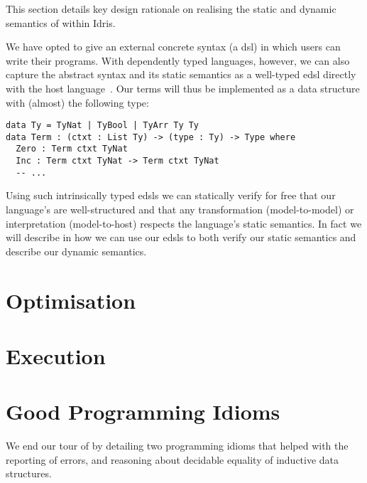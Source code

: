 \documentclass[%
draft, %
a4paper,
UKenglish,
cleveref,
autoref,
thm-restate,
pdfa
]{oasics-v2021}
\begin{document}
This section details key design rationale on realising the static and dynamic semantics of \Velo{} within Idris.

We have opted to give \Velo{} an external concrete syntax (a \ac{dsl}) in which users can write their programs.
%
With dependently typed languages, however, we can also capture the abstract syntax and its static semantics as a well-typed \ac{edsl} directly with the host language~\cite{Augustsson1999edt}.
Our terms will thus be implemented as a data structure with (almost) the following type:

\begin{Verbatim}
data Ty = TyNat | TyBool | TyArr Ty Ty
data Term : (ctxt : List Ty) -> (type : Ty) -> Type where
  Zero : Term ctxt TyNat
  Inc : Term ctxt TyNat -> Term ctxt TyNat
  -- ...
\end{Verbatim}

\noindent

Using such intrinsically typed \acp{edsl} we can statically verify for free that our language's are well-structured and that any transformation (model-to-model) or interpretation (model-to-host) respects the language's static semantics.
In fact we will describe in  how we can use our \acp{edsl} to both verify our static semantics and describe our dynamic semantics.






\section{Optimisation}
\label{sec:compiler-pass}



\section{Execution}
\label{sec:semantics}


\section{Good Programming Idioms}
\label{sec:idioms}

We end our tour of \Velo{} by detailing two programming idioms that helped with the reporting of errors, and reasoning about decidable equality of inductive data structures.
\end{document}
